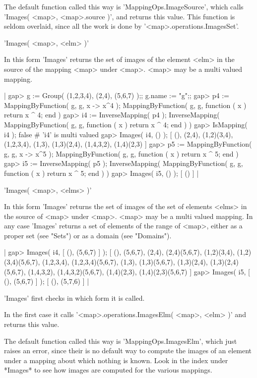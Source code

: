 The default function  called this way is  'MappingOps.ImageSource', which
calls 'Images(  <map>,  <map>.source  )',  and returns  this value.  This
function  is  seldom   overlaid,  since   all   the   work  is   done  by
'<map>.operations.ImagesSet'.


'Images( <map>, <elm> )'

In this form 'Images' returns the set of images  of the element  <elm> in
the source of the mapping <map> under <map>.  <map> may be a multi valued
mapping.

|    gap> g := Group( (1,2,3,4), (2,4), (5,6,7) );;  g.name := "g";;
    gap> p4 := MappingByFunction( g, g, x -> x^4 );
    MappingByFunction( g, g, function ( x )
        return x ^ 4;
    end )
    gap> i4 := InverseMapping( p4 );
    InverseMapping( MappingByFunction( g, g, function ( x )
        return x ^ 4;
    end ) )
    gap> IsMapping( i4 );
    false    # 'i4' is multi valued
    gap> Images( i4, () );
    [ (), (2,4), (1,2)(3,4), (1,2,3,4), (1,3), (1,3)(2,4), (1,4,3,2),
      (1,4)(2,3) ]
    gap> p5 := MappingByFunction( g, g, x -> x^5 );
    MappingByFunction( g, g, function ( x )
        return x ^ 5;
    end )
    gap> i5 := InverseMapping( p5 );
    InverseMapping( MappingByFunction( g, g, function ( x )
        return x ^ 5;
    end ) )
    gap> Images( i5, () );
    [ () ] |

'Images( <map>, <elms> )'

In this form 'Images'  returns the set of  images of the set of  elements
<elms> in the source  of <map> under  <map>.  <map> may be a multi valued
mapping.   In any case 'Images' returns a set of elements of the range of
<map>,  either as  a  proper  set  (see  "Sets")  or  as  a  domain  (see
"Domains").

|    gap> Images( i4, [ (), (5,6,7) ] );
    [ (), (5,6,7), (2,4), (2,4)(5,6,7), (1,2)(3,4), (1,2)(3,4)(5,6,7), 
      (1,2,3,4), (1,2,3,4)(5,6,7), (1,3), (1,3)(5,6,7), (1,3)(2,4), 
      (1,3)(2,4)(5,6,7), (1,4,3,2), (1,4,3,2)(5,6,7), (1,4)(2,3), 
      (1,4)(2,3)(5,6,7) ]
    gap> Images( i5, [ (), (5,6,7) ] );
    [ (), (5,7,6) ] |

'Images' first checks in which form it is called.

In the first  case it  calls '<map>.operations.ImagesElm( <map>, <elm> )'
and returns this value.

The default  function  called  this way is 'MappingOps.ImagesElm',  which
just raises an error, since their is no default way to compute the images
of an element under a  mapping about which nothing is known.  Look in the
index  under *Images*  to  see  how images are computed  for  the various
mappings.

